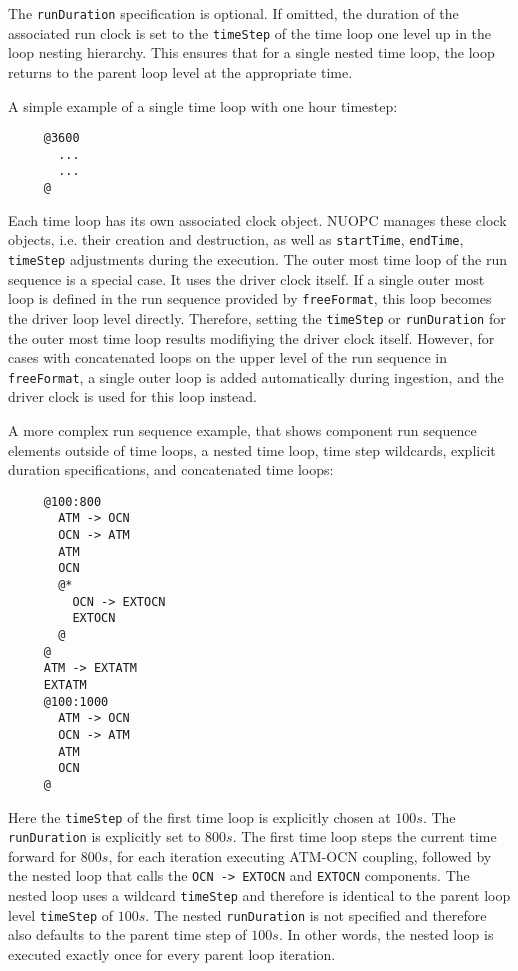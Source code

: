    The {\tt runDuration} specification is optional. If omitted, the duration of
   the associated run clock is set to the {\tt timeStep} of the time loop one
   level up in the loop nesting hierarchy. This ensures that for a single
   nested time loop, the loop returns to the parent loop level at the appropriate
   time.
  
   A simple example of a single time loop with one hour timestep:
  
   \begin{verbatim}
     @3600
       ...
       ...
     @
   \end{verbatim}
   Each time loop has its own associated clock object. NUOPC manages these clock
   objects, i.e. their creation and destruction, as well as {\tt startTime}, 
   {\tt endTime}, {\tt timeStep} adjustments during the execution. The outer 
   most time loop of the run sequence is a special case. It uses the driver 
   clock itself. If a single outer most loop is defined in the run sequence
   provided by {\tt freeFormat}, this loop becomes the driver loop level 
   directly. Therefore, setting the {\tt timeStep} or {\tt runDuration} for
   the outer most time loop results modifiying the driver clock itself.
   However, for cases with concatenated loops on the upper level of 
   the run sequence in {\tt freeFormat}, a single outer loop is added
   automatically during ingestion, and the driver clock is used for this loop 
   instead.
  
   A more complex run sequence example, that shows component run
   sequence elements outside of time loops, a nested time loop, time step 
   wildcards, explicit duration specifications, and concatenated time loops:
   
   \begin{verbatim}
     @100:800
       ATM -> OCN
       OCN -> ATM
       ATM
       OCN
       @*
         OCN -> EXTOCN
         EXTOCN
       @
     @
     ATM -> EXTATM
     EXTATM
     @100:1000
       ATM -> OCN
       OCN -> ATM
       ATM
       OCN
     @
   \end{verbatim}
   Here the {\tt timeStep} of the first time loop is explicitly chosen at
   $100s$. The {\tt runDuration} is explicitly set to $800s$. The first time
   loop steps the current time forward for $800s$, for each iteration executing
   ATM-OCN coupling, followed by the nested loop that calls the 
   {\tt OCN -> EXTOCN} and {\tt EXTOCN} components. The nested loop uses a 
    wildcard {\tt timeStep} and therefore is
   identical to the parent loop level {\tt timeStep} of $100s$. The nested
   {\tt runDuration} is not specified and therefore also defaults to the parent
   time step of $100s$. In other words, the nested loop is executed exactly once
   for every parent loop iteration.
  

